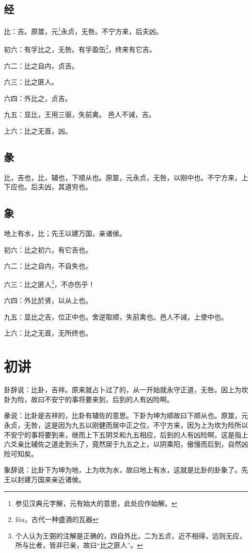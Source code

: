 \documentclass[12pt,oneside]{book}
\begin{document}
\subsection{经}
比：吉。原筮，元\footnote{参见汉典元字解，元有始大的意思，此处应作始解。}永贞，无咎。不宁方来，后夫凶。

初六：有孚比之，无咎。有孚盈缶\footnote{fǒu，古代一种盛酒的瓦器}，终来有它吉。

六二：比之自内，贞吉。

六三：比之匪人。

六四：外比之，贞吉。

九五：显比，王用三驱，失前禽。 邑人不诫，吉。

上六：比之无首，凶。

\subsection{彖}
比，吉也，比，辅也，下顺从也。原筮，元永贞，无咎，以刚中也。不宁方来，上下应也。后夫凶，其道穷也。

\subsection{象}
地上有水，比；先王以建万国，亲诸侯。

初六：比之初六，有它吉也。

六二：比之自内，不自失也。

六三：比之匪人\footnote{个人认为王弼的注解是正确的，四自外比，二为五贞，近不相得，远则无应，所与比者，皆非已亲，故曰“比之匪人”。}，不亦伤乎！

六四：外比於贤，以从上也。

九五：显比之吉，位正中也。舍逆取顺，失前禽也。邑人不诫，上使中也。

上六：比之无首，无所终也。

\section{初讲}
卦辞说：比卦，吉祥。原来就占卜过了的，从一开始就永守正道，无咎。因上为坎卦为险，故曰不安宁的事将要来到，后到的人有凶险啊。

彖说：比卦是吉祥的，比卦有辅佐的意思。下卦为坤为顺故曰下顺从也。原筮，元永贞，无咎，这是因为九五以刚健而居中正之位，不宁方来，因为上为坎为险所以不安宁的事将要到来，继而上下五阴爻和九五相应，后到的人有凶险啊，这是指上六爻亲比辅佐之道走到头了，竟然居于九五之上，以阴乘阳，傲慢而后到，自然凶险可知矣。

象辞说：比卦下为坤为地，上为坎为水，故曰地上有水，这就是比卦的卦象了。先王以封建万国来亲近诸侯。
\end{document}
